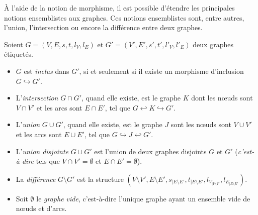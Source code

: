 À l'aide de la notion de morphisme, il est possible d'étendre les principales
notions ensemblistes aux graphes. %
Ces notions ensemblistes sont, entre autres, l'union, l'intersection ou encore
la différence entre deux graphes. %

\noindent
\begin{minipage}{1.0\linewidth}
  \begin{definition}
	\label{def:graphe-notions-ensemblistes}
	Soient $G = (V,E,s,t,l_{V},l_{E})$ et $G'=(V',E',s',t',l'_{V},l'_{E})$ deux
	graphes étiquetés. %

	\begin{itemize}
      \item $G$ est  \emph{inclus} dans $G'$, si et seulement si il existe un morphisme d'inclusion $G \hookrightarrow G'$.

      \item L'\emph{intersection} $G \cap G'$, quand elle existe, est le graphe
            $K$ dont les n\oe uds sont $V \cap V'$ et les arcs sont $E \cap E'$, tel
            que $G \hookleftarrow K \hookrightarrow G'$.

      \item L'\emph{union} $G \cup G'$, quand elle existe, est le graphe $J$ sont
            les n\oe uds sont $V \cup V'$ et les arcs sont $E \cup E'$, tel que
            $G \hookrightarrow J \hookleftarrow G'$.

      \item L'\emph{union disjointe} $G \sqcup G'$ est l'union de deux graphes
            disjoints $G$ et $G'$ (\emph{c'est-à-dire} tels que $V \cap V' = \emptyset$ et
            $E \cap E' = \emptyset$).

      \item La \emph{différence} $G \setminus G'$ est la structure
            $(V \setminus V', E \setminus E', s_{|E \setminus E'}, t_{|E \setminus E'}, l_{V_{|V \setminus V'}}, l_{E_{|E \setminus E'}})$.

      \item Soit $\emptyset$ le \emph{graphe vide}, c'est-à-dire l'unique graphe
            ayant un ensemble vide de n\oe uds et d'arcs.
	\end{itemize}
  \end{definition}
\end{minipage}

